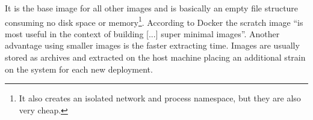 It is the base image for all other images and is basically an empty file structure consuming no disk space or memory\footnote{It also creates an isolated network and process namespace, but they are also very cheap.}. According to Docker the scratch image ``is most useful in the context of building [...] super minimal images''\cite{scratchImageDockerD65:online}. Another advantage using smaller images is the faster extracting time. Images are usually stored as archives and extracted on the host machine placing an additional strain on the system for each new deployment.\\[0.5mm]
